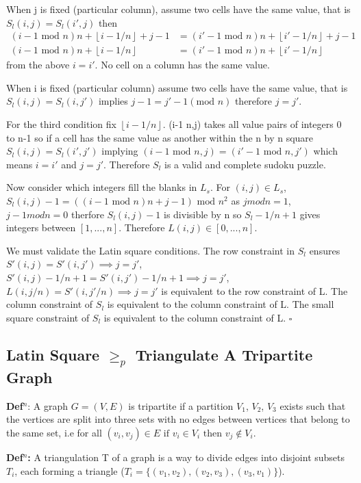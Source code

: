 \documentclass[a4paper,11pt]{report}
\newcounter{row}
\newcounter{col}
\begin{document}
When j is fixed (particular column), assume two cells have the same value, that is $S_l(i,j)=S_l(i',j)$ then
\begin{align}
(i-1 \text{ mod } n)n + \left\lfloor{i-1/n}\right\rfloor+j-1 &= (i'-1 \text{ mod } n)n +
\left\lfloor{i'-1/n}\right\rfloor+j-1\\
	(i-1 \text{ mod } n)n + \left\lfloor{i-1/n}\right\rfloor &= (i'-1 \text{ mod } n)n + \left\lfloor{i'-1/n}\right\rfloor
\end{align}
from the above $i=i'$. No cell on a column has the same value.

When i is fixed (particular column) assume two cells have the same value, that is $S_l(i,j)=S_l(i,j')$ implies $j-1=j'-1 (\text{mod }n)$ therefore $j=j'$.

For the third condition fix $\left\lfloor{i-1/n}\right\rfloor$. (i-1  n,j) takes all value pairs of integers 0 to n-1 so if a cell has the same value as another within the n by n square $S_l(i,j)=S_l(i',j')$ implying $(i-1 \text{ mod }n,j)=(i'-1 \text{ mod } n,j')$ which means $i=i'$ and $j=j'$. Therefore $S_l$ is a valid and complete sudoku puzzle.

Now consider which integers fill the blanks in $L_s$. For $(i,j)\in L_s$, $S_l(i,j)-1= ((i-1 \text{ mod } n)n+j-1)\text{ mod } n^2$ as $j mod n=1$, $j-1modn=0$ therfore $S_l(i,j)-1$ is divisible by n so $S_l-1/n+1$ gives integers between $[1,...,n]$.
Therefore $L(i,j) \in [0,...,n]$.

We must validate the Latin square conditions. The row constraint in $S_l$ ensures $S'(i,j)=S'(i,j') \implies j=j'$, $S'(i,j)-1/n+1=S'(i,j')-1/n+1 \implies j=j'$, $L(i,j/n)=S'(i,j'/n) \implies j=j'$ is equivalent to the row constraint of L. The column constraint of $S_l$ is equivalent to the column constraint of L. The small square constraint of $S_l$ is equivalent to the column constraint of L. $\square$

\subsection{Latin Square $\geq_p$ Triangulate A Tripartite Graph}

\textbf{Def$^n$}: A graph $G=(V,E)$ is tripartite if a partition $V_1$, $V_2$, $V_3$ exists such that the vertices are split into three sets with no edges between vertices that belong to the same set, i.e for all $(v_i,v_j) \in E\text{ if } v_i \in V_i\text{ then }v_j \not\in V_i $.

\textbf{Def$^n$:} A triangulation T of a graph is a way to divide edges into disjoint subsets $T_i$, each forming a triangle ($T_i=\{(v_{1}, v_{2}),(v_{2}, v_{3}),(v_{3},v_{1})\}$).
\end{document}
